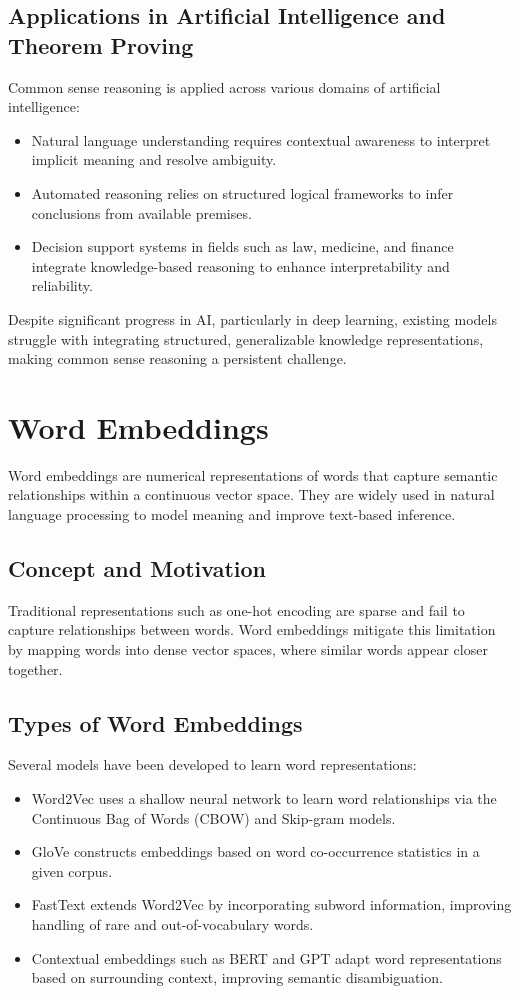 \documentclass[english,version-2020-11]{uzl-thesis}
\begin{document}
\subsection{Applications in Artificial Intelligence and Theorem Proving}
Common sense reasoning is applied across various domains of artificial intelligence:
\begin{itemize}
    \item Natural language understanding requires contextual awareness to interpret implicit meaning and resolve ambiguity.
    \item Automated reasoning relies on structured logical frameworks to infer conclusions from available premises.
    \item Decision support systems in fields such as law, medicine, and finance integrate knowledge-based reasoning to enhance interpretability and reliability.
\end{itemize}

Despite significant progress in AI, particularly in deep learning, existing models struggle with integrating structured, generalizable knowledge representations, making common sense reasoning a persistent challenge.

\section{Word Embeddings}

Word embeddings are numerical representations of words that capture semantic relationships within a continuous vector space. They are widely used in natural language processing to model meaning and improve text-based inference.

\subsection{Concept and Motivation}
Traditional representations such as one-hot encoding are sparse and fail to capture relationships between words. Word embeddings mitigate this limitation by mapping words into dense vector spaces, where similar words appear closer together.

\subsection{Types of Word Embeddings}
Several models have been developed to learn word representations:
\begin{itemize}
    \item Word2Vec \cite{Mikolov2013} uses a shallow neural network to learn word relationships via the Continuous Bag of Words (CBOW) and Skip-gram models.
    \item GloVe \cite{Pennington2014} constructs embeddings based on word co-occurrence statistics in a given corpus.
    \item FastText \cite{Bojanowski2017} extends Word2Vec by incorporating subword information, improving handling of rare and out-of-vocabulary words.
    \item Contextual embeddings such as BERT and GPT \cite{Devlin2019} adapt word representations based on surrounding context, improving semantic disambiguation.
\end{itemize}
\end{document}
